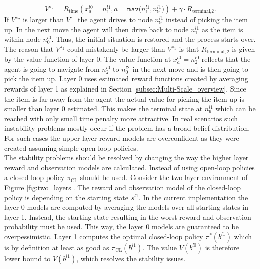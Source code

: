%
\begin{equation}\label{eq:Vpi2}
V^{\pi_2}=R_\text{time}\left( x_a^{l0}=n_1^{l1}, a=\texttt{nav($n_1^{l1}, n_9^{l1}$)} \right) + \gamma \cdot R_{\text{terminal,}2}.
\end{equation}
If $V^{\pi_2}$ is larger than $V^{\pi_1}$ the agent drives to node $n_9^{l1}$ instead of picking the item up. In the next move the agent will then drive back to node $n_1^{l1}$ as the item is within node $n_0^{l0}$. Thus, the initial situation is restored and the process starts over. The reason that $V^{\pi_2}$ could mistakenly be larger than $V^{\pi_1}$ is that $R_{\text{terminal},2}$ is given by the value function of layer 0. The value function at $x_a^{l0}=n_2^{l0}$ reflects that the agent is going to navigate from $n_2^{l0}$ to $n_0^{l2}$ in the next move and is then going to pick the item up. Layer 0 uses estimated reward functions created by averaging rewards of layer 1 as explained in Section \ref{subsec:Multi-Scale_overview}. Since the item is far away from the agent the actual value for picking the item up is smaller than layer 0 estimated. This makes the terminal state at $n_9^{l1}$ which can be reached with only small time penalty more attractive. In real scenarios such instability problems mostly occur if the problem has a broad belief distribution. For such cases the upper layer reward models are overconfident as they were created assuming simple open-loop policies.\\

The stability problems should be resolved by changing the way the higher layer reward and observation models are calculated. Instead of using open-loop policies a closed-loop policy $\pi_\text{CL}$ should be used. Consider the two-layer environment of Figure \ref{fig:two_layers}. The reward and observation model of the closed-loop policy is depending on the starting state $s^{l1}$. In the current implementation the layer 0 models are computed by averaging the models over all starting states in layer 1. Instead, the starting state resulting in the worst reward and observation probability must be used. This way, the layer 0 models are guaranteed to be overpessimistic. Layer 1 computes the optimal closed-loop policy $\pi^*\left(b^{l1}\right)$ which is by definition at least as good as $\pi_\text{CL}\left(b^{l1}\right)$. The value $V\left(b^{l0}\right)$ is therefore lower bound to $V(b^{l1})$, which resolves the stability issues. 


